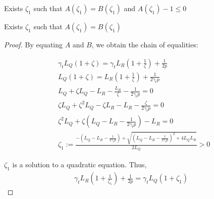\begin{lemma}\label{lem:Technical}
    Exists $\zeta_1$ such that $A(\zeta_1) = B(\zeta_1)$ and $A(\zeta_1) - 1 \leq 0$
\end{lemma}
\begin{sublemma}\label{sublem:sublemma_1}
    Exists $\zeta_1$ such that $A(\zeta_1) = B(\zeta_1)$
\end{sublemma}
\begin{proof}
    By equating $A$ and $B$, we obtain the chain of equalities:

    \begin{align}
        &\gamma_{t} L_Q(1+\zeta)= \gamma_{t} L_R(1+\frac{1}{\zeta}) + \frac{1}{2p} \\
        &L_Q(1+\zeta) = L_R(1+\frac{1}{\zeta}) + \frac{1}{2\gamma_{t} p} \\
        &L_Q + \zeta L_Q - L_R - \frac{L_R}{\zeta} - \frac{1}{2\gamma_{t} p} = 0 \\
        &\zeta L_Q + \zeta^2 L_Q - \zeta L_R - L_R - \frac{\zeta}{2\gamma_{t} p} = 0\\
        &\zeta^2 L_Q + \zeta (L_Q - L_R - \frac{1}{2\gamma_{t} p}) - L_R = 0 \\
        &\zeta_{1} := \frac{-(L_Q - L_R - \frac{1}{2\gamma_{t} p}) + \sqrt{(L_Q - L_R - \frac{1}{2\gamma_{t} p})^2 + 4 L_Q L_R}}{2L_Q} > 0
    \end{align}
    
    $\zeta_{1}$ is a solution to a quadratic equation. Thus,
    \begin{align}
        \gamma_{t} L_R (1+\frac{1}{\zeta_1}) + \frac{1}{2p} = \gamma_{t} L_Q (1+\zeta_1) \label{eq:St_5}
    \end{align}
\end{proof}


